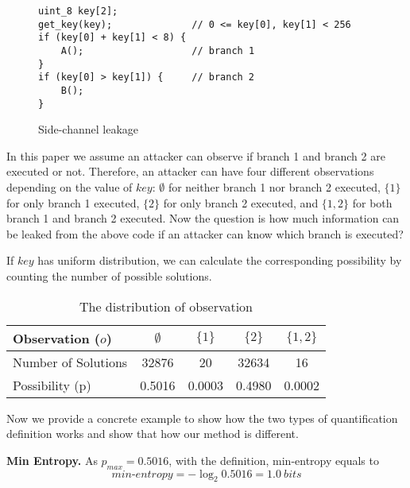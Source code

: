 \begin{figure}[h!]
    \centering
\begin{lstlisting}[xleftmargin=.03\textwidth,xrightmargin=.01\textwidth]
uint_8 key[2];
get_key(key);              // 0 <= key[0], key[1] < 256
if (key[0] + key[1] < 8) {
    A();                   // branch 1
}
if (key[0] > key[1]) {     // branch 2
    B();
}
\end{lstlisting}
\caption{Side-channel leakage}
\label{background::side-channel}
\end{figure}
In this paper we assume an attacker can observe 
if branch 1 and branch 2 are executed or not. Therefore, 
an attacker can have four different observations depending on
the value of $\mathit{key}$:
$\emptyset$ for neither branch 1 nor branch 2 executed,
$\{1\}$ for only branch 1 executed,
$\{2\}$ for only branch 2 executed, and
 $\{1, 2\}$ for both branch 1 and branch 2 executed.
Now the question is how much information can be leaked from the 
above code if an attacker can know which branch is executed?

If $key$ has uniform distribution, we can calculate the corresponding
possibility by counting the number of possible solutions.
\begin{table}[ht]
    \centering


\begin{tabular}{l|cccc}
    \hline
Observation ($o$)  & $\emptyset$ & ${\{1\}}$ & ${\{2\}}$ & ${\{1, 2\}}$ \\ \hline
Number of Solutions &  32876 & 20 & 32634 & 16 \\ \hline
Possibility (p)     & 0.5016 & 0.0003 & 0.4980  & 0.0002   \\
    \hline
\end{tabular}
\caption{The distribution of observation}
\label{shtable}
\end{table}


Now we provide a concrete example to show how the two types of quantification definition works and show that
how our method is different.

\vspace{3pt}
\textbf{Min Entropy.}
As $p_{max} = 0.5016$, with the definition, min-entropy equals to 
\begin{displaymath}
    \mathit{min\text{-}entropy} = -\log_2{0.5016} = 1.0\ \mathit{bits}
\end{displaymath}

